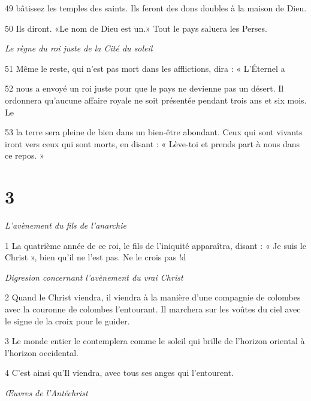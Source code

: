 \par 49 bâtissez les temples des saints. Ils feront des dons doubles à la maison de Dieu.

\par 50 Ils diront. «Le nom de Dieu est un.» Tout le pays saluera les Perses.

\par \textit{Le règne du roi juste de la Cité du soleil}

\par 51 Même le reste, qui n'est pas mort dans les afflictions, dira : « L'Éternel a

\par 52 nous a envoyé un roi juste pour que le pays ne devienne pas un désert. Il ordonnera qu'aucune affaire royale ne soit présentée pendant trois ans et six mois. Le

\par 53 la terre sera pleine de bien dans un bien-être abondant. Ceux qui sont vivants iront vers ceux qui sont morts, en disant : « Lève-toi et prends part à nous dans ce repos. »

\chapter{3}

\par \textit{L'avènement du fils de l'anarchie}

\par 1 La quatrième année de ce roi, le fils de l'iniquité apparaîtra, disant : « Je suis le Christ », bien qu'il ne l'est pas. Ne le crois pas !d

\par \textit{Digresion concernant l'avènement du vrai Christ}

\par 2 Quand le Christ viendra, il viendra à la manière d'une compagnie de colombes avec la couronne de colombes l'entourant. Il marchera sur les voûtes du ciel avec le signe de la croix pour le guider.

\par 3 Le monde entier le contemplera comme le soleil qui brille de l'horizon oriental à l'horizon occidental.

\par 4 C'est ainsi qu'Il viendra, avec tous ses anges qui l'entourent.


\par \textit{Œuvres de l'Antéchrist}

